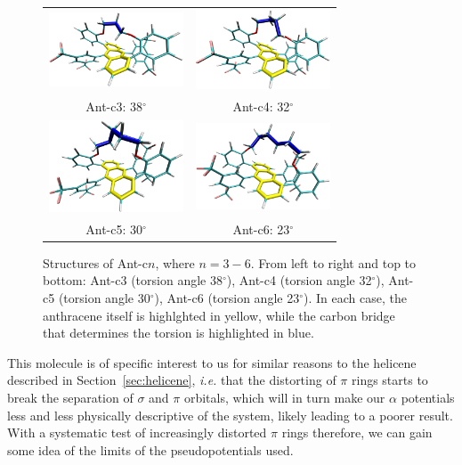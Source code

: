\documentclass[aip,reprint,nofootinbib]{revtex4-1}
\begin{document}
\begin{figure}
\begin{center}
\begin{tabular}{c c}
\includegraphics[width=4cm]{c3-highlights} & \includegraphics[width=4cm]{c4-highlights} \\
Ant-c3: 38$^{\circ}$ & Ant-c4: 32$^{\circ}$ \\
\includegraphics[width=4cm]{c5-highlights} &
\includegraphics[width=4cm]{c6-highlights} \\
Ant-c5: 30$^{\circ}$ & Ant-c6: 23$^{\circ}$ \\
\end{tabular} 
\end{center}
\caption[Twistacene structure diagrams.]{Structures of Ant-c$n$, where $n=3-6$. From left to right and top to bottom: Ant-c3 (torsion angle 38$^{\circ}$), Ant-c4 (torsion angle 32$^{\circ}$), Ant-c5 (torsion angle 30$^{\circ}$), Ant-c6 (torsion angle 23$^{\circ}$). In each case, the anthracene itself is highlghted in yellow, while the carbon bridge that determines the torsion is highlighted in blue.}\label{fig:tetheredanthracene}
\end{figure}

This molecule is of specific interest to us for similar reasons to the helicene described in Section~\ref{sec:helicene}, \emph{i.e.} that the distorting of $\pi$ rings starts to break the separation of $\sigma$ and $\pi$ orbitals, which will in turn make our $\alpha$ potentials less and less physically descriptive of the system, likely leading to a poorer result. With a systematic test of increasingly distorted $\pi$ rings therefore, we can gain some idea of the limits of the pseudopotentials used.
\end{document}
